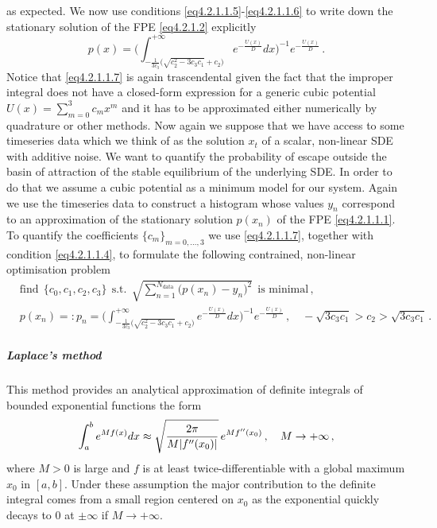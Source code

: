 \documentclass[../main.tex]{subfiles}
\begin{document}
as expected.
We now use conditions \eqref{eq4.2.1.1.5}-\eqref{eq4.2.1.1.6} to write down the stationary solution of the FPE \eqref{eq4.2.1.2} explicitly 
\begin{equation}\label{eq4.2.1.1.7}
     p(x) = \Bigg(\int_{-\frac{1}{3c_{3}}\Big(\sqrt{c_{2}^{2}-3 c_{3}c_{1}}+c_{2}\Big)}^{+\infty}e^{-\frac{U(x)}{D}}dx\Bigg)^{-1}e^{-\frac{U(x)}{D}}\,.
\end{equation}
Notice that \eqref{eq4.2.1.1.7} is again trascendental given the fact that the improper integral does not have a closed-form expression for a generic cubic potential $U(x)=\sum_{m=0}^{3}c_{m}x^{m}$ and it has to be approximated either numerically by quadrature or other methods.
Now again we suppose that we have access to some timeseries data which we think of as the solution $x_{t}$ of a scalar, non-linear SDE with additive noise.
We want to quantify the probability of escape outside the basin of attraction of the stable equilibrium of the underlying SDE.
In order to do that we assume a cubic potential as a minimum model for our system.
Again we use the timeseries data to construct a histogram whose values $y_{n}$ correspond to an approximation of the stationary solution $p(x_{n})$ of the FPE \eqref{eq4.2.1.1.1}.
To quantify the coefficients $\{c_{m}\}_{m=0,\dots,3}$ we use \eqref{eq4.2.1.1.7}, together with condition \eqref{eq4.2.1.1.4}, to formulate the following contrained, non-linear optimisation problem
\begin{align}
     &\text{find}\;\,\{c_{0},c_{1},c_{2},c_{3}\}\;\,\text{s.t.}\;\,\sqrt{\sum_{n=1}^{N_{\text{data}}}\big(p(x_{n}) - y_{n}\big)^{2}}\;\,\text{is minimal}\,, \label{eq4.2.1.1.8} \\ 
     &p(x_{n}) =: p_{n} = \Bigg(\int_{-\frac{1}{3c_{3}}\Big(\sqrt{c_{2}^{2}-3 c_{3}c_{1}}+c_{2}\Big)}^{+\infty}e^{-\frac{U(x)}{D}}dx\Bigg)^{-1}e^{-\frac{U(x)}{D}}\,,\quad -\sqrt{3c_{3}c_{1}}>c_{2}>\sqrt{3c_{3}c_{1}}\,.\nonumber
\end{align}
\subparagraph{Laplace's method}
This method provides an analytical approximation of definite integrals of bounded exponential functions the form
\begin{equation}\label{eq4.2.1.1.9}
        \int_{a}^{b}e^{Mf(x)}dx\approx \sqrt{\frac{2\pi}{M|f''(x_{0})|}}\,e^{M f''(x_{0})}\,,\quad M\to+\infty\,,
\end{equation}
where $M>0$ is large and $f$ is at least twice-differentiable with a global maximum $x_{0}$ in $[a,b]$.
Under these assumption the major contribution to the definite integral comes from a small region centered on $x_{0}$ as the exponential quickly decays to $0$ at $\pm\infty$ if $M\to+\infty$.
\end{document}
